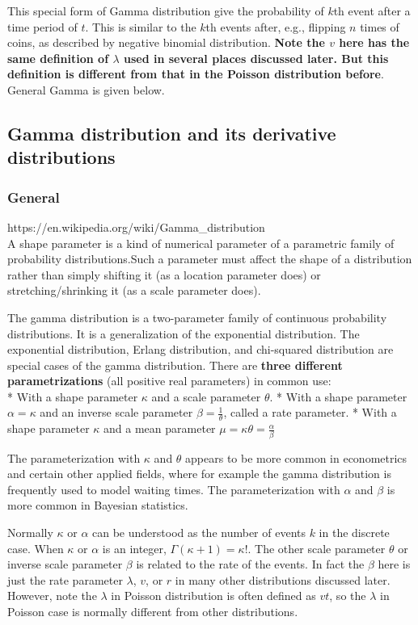 \documentclass[11pt]{article}
\begin{document}
This special form of Gamma distribution give the probability of \(k\)th
event after a time period of \(t\). This is similar to the \(k\)th
events after, e.g., flipping \(n\) times of coins, as described by
negative binomial distribution. \textbf{Note the \(v\) here has the same
definition of \(\lambda\) used in several places discussed later. But
this definition is different from that in the Poisson distribution
before}. General Gamma is given below.

    \subsection{Gamma distribution and its derivative
distributions}\label{gamma-distribution-and-its-derivative-distributions}

\subsubsection{General}\label{general}

https://en.wikipedia.org/wiki/Gamma\_distribution\\
A shape parameter is a kind of numerical parameter of a parametric
family of probability distributions.Such a parameter must affect the
shape of a distribution rather than simply shifting it (as a location
parameter does) or stretching/shrinking it (as a scale parameter does).

The gamma distribution is a two-parameter family of continuous
probability distributions. It is a generalization of the exponential
distribution. The exponential distribution, Erlang distribution, and
chi-squared distribution are special cases of the gamma distribution.
There are \textbf{three different parametrizations} (all positive real
parameters) in common use:\\
* With a shape parameter \(\kappa\) and a scale parameter \(\theta\). *
With a shape parameter \(\alpha = \kappa\) and an inverse scale
parameter \(\beta = \frac{1}{\theta}\), called a rate parameter. * With
a shape parameter \(\kappa\) and a mean parameter
\(\mu = \kappa \theta = \frac{\alpha}{\beta}\)

The parameterization with \(\kappa\) and \(\theta\) appears to be more
common in econometrics and certain other applied fields, where for
example the gamma distribution is frequently used to model waiting
times. The parameterization with \(\alpha\) and \(\beta\) is more common
in Bayesian statistics.

Normally \(\kappa\) or \(\alpha\) can be understood as the number of
events \(k\) in the discrete case. When \(\kappa\) or \(\alpha\) is an
integer, \(\Gamma(\kappa+1) = \kappa!\). The other scale parameter
\(\theta\) or inverse scale parameter \(\beta\) is related to the rate
of the events. In fact the \(\beta\) here is just the rate parameter
\(\lambda\), \(v\), or \(r\) in many other distributions discussed
later. However, note the \(\lambda\) in Poisson distribution is often
defined as \(vt\), so the \(\lambda\) in Poisson case is normally
different from other distributions.
\end{document}
